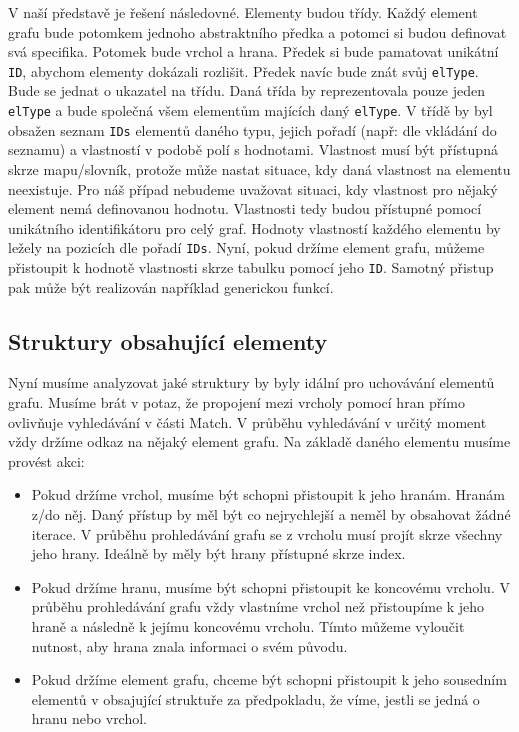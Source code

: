 V naší představě je řešení následovné.
Elementy budou třídy.
Každý element grafu bude potomkem jednoho abstraktního předka a potomci si budou definovat svá specifika.
Potomek bude vrchol a hrana.
Předek si bude pamatovat unikátní \verb+ID+, abychom elementy dokázali rozlišit. 
Předek navíc bude znát svůj \verb+elType+. 
Bude se jednat o ukazatel na třídu.
Daná třída by reprezentovala pouze jeden \verb+elType+ a bude společná všem elementům majících daný \verb+elType+.
V třídě by byl obsažen seznam \verb+IDs+ elementů daného typu, jejich pořadí (např: dle vkládání do seznamu) a vlastností v podobě polí s hodnotami.
Vlastnost musí být přístupná skrze mapu/slovník, protože může nastat situace, kdy daná vlastnost na elementu neexistuje. 
Pro náš případ nebudeme uvažovat situaci, kdy vlastnost pro nějaký element nemá definovanou hodnotu.
Vlastnosti tedy budou přístupné pomocí unikátního identifikátoru pro celý graf.
Hodnoty vlastností každého elementu by ležely na pozicích dle pořadí \verb+IDs+.
Nyní, pokud držíme element grafu, můžeme přistoupit k hodnotě vlastnosti skrze tabulku pomocí jeho \verb+ID+.    
Samotný přistup pak může být realizován například generickou funkcí. 

\subsection{Struktury obsahující elementy}

Nyní musíme analyzovat jaké struktury by byly idální pro uchovávání elementů grafu.
Musíme brát v potaz, že propojení mezi vrcholy pomocí hran přímo ovlivňuje vyhledávání v části Match.
V průběhu vyhledávání v určitý moment vždy držíme odkaz na nějaký element grafu.
Na základě daného elementu musíme provést akci:

\begin{itemize}

\item Pokud držíme vrchol, musíme být schopni přistoupit k jeho hranám. Hranám z/do něj. Daný přístup by měl být co nejrychlejší a neměl by obsahovat žádné iterace. V průběhu prohledávání grafu se z vrcholu musí projít skrze všechny jeho hrany. Ideálně by měly být hrany přístupné skrze index.

\item Pokud držíme hranu, musíme být schopni přistoupit ke koncovému vrcholu. V průběhu prohledávání grafu vždy vlastníme vrchol než přistoupíme k jeho hraně a následně k jejímu koncovému vrcholu. Tímto můžeme vyloučit nutnost, aby hrana znala informaci o svém původu.

\item Pokud držíme element grafu, chceme být schopni přistoupit k jeho sousedním elementů v obsajující struktuře za předpokladu, že víme, jestli se jedná o hranu nebo vrchol. 

\end{itemize}

